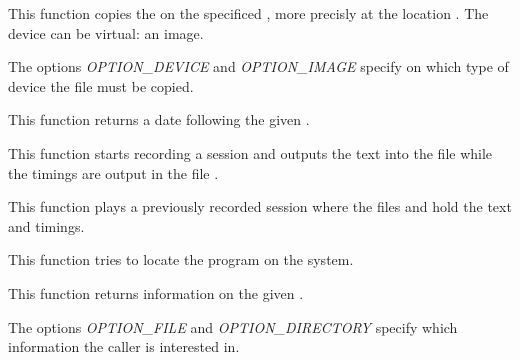          {
	   This function copies the  on the specificed
	   , more precisly at the location .
	   The device can be virtual: an image.

	   \-

	   The options \textit{OPTION\_DEVICE} and \textit{OPTION\_IMAGE}
	   specify on which type of device the file must be copied.
	 }

         {
	   This function returns a date following the given .
	 }

         {
	   This function starts recording a session and outputs
	   the text into the file  while the timings
	   are output in the file .
	 }

         {
	   This function plays a previously recorded session where
	   the files  and  hold the
	   text and timings.
	 }

         {
	   This function tries to locate the program 
	   on the system.
	 }

         {
	   This function returns information on the given .

	   \-

	   The options \textit{OPTION\_FILE} and \textit{OPTION\_DIRECTORY}
	   specify which information the caller is interested in.
	 }
